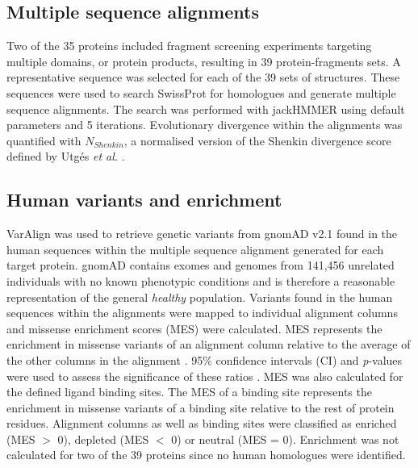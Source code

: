 \subsection{Multiple sequence alignments}

Two of the 35 proteins included fragment screening experiments targeting multiple domains, or protein products, resulting in 39 protein-fragments sets. A representative sequence was selected for each of the 39 sets of structures. These sequences were used to search SwissProt \cite{BOUTET_2016_UNIPROT} for homologues and generate multiple sequence alignments. The search was performed with jackHMMER \cite{EDDY_1995_HMMER} using default parameters and 5 iterations. Evolutionary divergence within the alignments was quantified with $N_{Shenkin}$, a normalised version of the Shenkin divergence score \cite{SHENKIN_1991_SCORE} defined by Utgés \textit{et al.} \cite{UTGES_2021_ANKS}.


\subsection{Human variants and enrichment}

VarAlign \cite{MACGOWAN_2020_DRSASP} was used to retrieve genetic variants from gnomAD v2.1 \cite{KARCZEWSKI_2020_GNOMAD} found in the human sequences within the multiple sequence alignment generated for each target protein. gnomAD contains exomes and genomes from 141,456 unrelated individuals with no known phenotypic conditions and is therefore a reasonable representation of the general \textit{healthy} population. Variants found in the human sequences within the alignments were mapped to individual alignment columns and missense enrichment scores (MES) were calculated. MES represents the enrichment in missense variants of an alignment column relative to the average of the other columns in the alignment \cite{MACGOWAN_2017_VARIANTS, MACGOWAN_2024_VARIANTS}. 95\% confidence intervals (CI) and \textit{p}-values were used to assess the significance of these ratios \cite{SZUMILAS_2010_ODDSRATIOS}. MES was also calculated for the defined ligand binding sites. The MES of a binding site represents the enrichment in missense variants of a binding site relative to the rest of protein residues. Alignment columns as well as binding sites were classified as enriched (MES $>$ 0), depleted (MES $<$ 0) or neutral (MES = 0). Enrichment was not calculated for two of the 39 proteins since no human homologues were identified.


